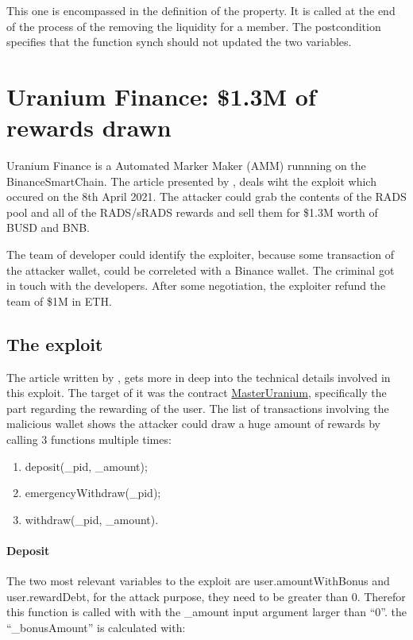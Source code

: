 This one is encompassed in the definition of the property. 
It is called at the end of the process of the removing the liquidity for a member. 
The postcondition specifies that the function synch should not updated the two variables.


\section{Uranium Finance: \$1.3M of rewards drawn}   
\label{sec:Exploits:Uranium}
Uranium Finance is a Automated Marker Maker (AMM) runnning on the BinanceSmartChain.
The article presented by \citet{UraniumPM}, deals wiht the exploit which occured on the 
8th April 2021. The attacker could grab the contents of the RADS pool and all of the RADS/sRADS rewards 
and sell them for \$1.3M worth of BUSD and BNB.

The team of developer could identify the exploiter, because some transaction of the attacker wallet, could be 
correleted with a Binance wallet. The criminal got in touch with the developers. After some negotiation, 
the exploiter refund the team of \$1M in ETH.

\subsection{The exploit}
\label{sec:Uranium:Exploit}


The article written by \citeauthor{UraniumTech}, gets more in deep into the technical details involved in this exploit.
The target of it was the contract \href{https://bscscan.com/address/0xd5aac41d315c1d382dcf1c39d4ed9b37c224edf2#code}{MasterUranium}, specifically the part regarding the rewarding of the user.
The list of transactions involving the malicious wallet shows the attacker could draw a huge amount of rewards 
by calling 3 functions multiple times:
\begin{enumerate}
    \item deposit(\_pid, \_amount); 
    \item emergencyWithdraw(\_pid); 
    \item withdraw(\_pid, \_amount).
\end{enumerate}


\paragraph{Deposit} The two most relevant variables to the exploit are user.amountWithBonus and user.rewardDebt, for the attack purpose, they need to be greater than 0.
Therefor this function is called with  with the \_amount input argument larger than “0”. 
the “\_bonusAmount” is calculated with:

